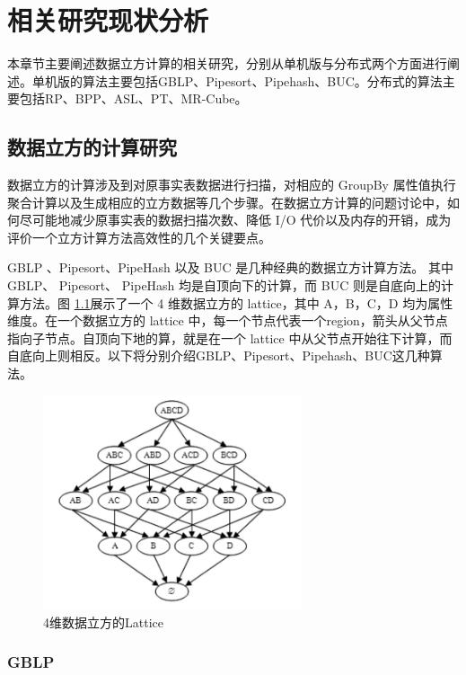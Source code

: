 \chapter{相关研究现状分析}

本章节主要阐述数据立方计算的相关研究，分别从单机版与分布式两个方面进行阐述。单机版的算法主要包括GBLP、Pipesort、Pipehash、BUC。分布式的算法主要包括RP、BPP、ASL、PT、MR-Cube。

\section{数据立方的计算研究}

数据立方的计算涉及到对原事实表数据进行扫描，对相应的 GroupBy 属性值执行聚合计算以及生成相应的立方数据等几个步骤。在数据立方计算的问题讨论中，如何尽可能地减少原事实表的数据扫描次数、降低 I/O 代价以及内存的开销，成为评价一个立方计算方法高效性的几个关键要点。

GBLP \cite{gray1997data}、Pipesort、PipeHash \cite{agarwal1996computation} 以及 BUC \cite{beyer1999bottom} 是几种经典的数据立方计算方法。 其中GBLP、 Pipesort、 PipeHash 均是自顶向下的计算，而 BUC 则是自底向上的计算方法。图 \ref{4_dimension_lattice}展示了一个 4 维数据立方的 lattice，其中 A，B，C，D 均为属性维度。在一个数据立方的 lattice 中，每一个节点代表一个region，箭头从父节点指向子节点。自顶向下地的算，就是在一个 lattice 中从父节点开始往下计算，而自底向上则相反。以下将分别介绍GBLP、Pipesort、Pipehash、BUC这几种算法。


\begin{figure}[!htb]
\centering\includegraphics[width=3in]{picture/ch_current_research/4_dimension_lattice} 
\caption{4维数据立方的Lattice}\label{4_dimension_lattice} 
\end{figure} 

\subsection{GBLP}


